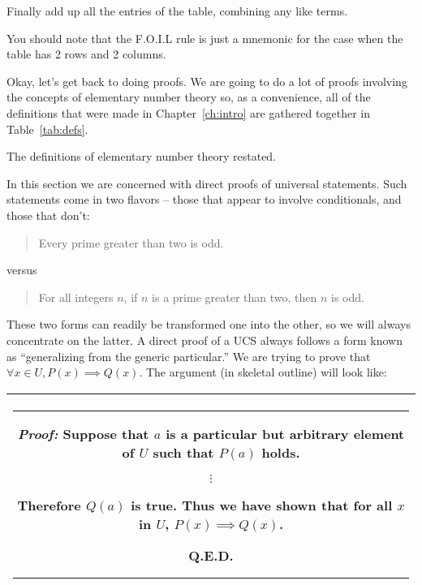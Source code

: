 Finally add up all the entries of the table, combining any like terms.

You should note that the F.O.I.L rule is just a mnemonic for the case when 
the table has 2 rows and 2 columns.

Okay, let's get back to doing proofs.  We are going to do a lot of
proofs involving the concepts of elementary number theory so, as a 
convenience, all of the definitions that were made in Chapter~\ref{ch:intro}
are gathered together in Table~\ref{tab:defs}.

\begin{table}[hbt] 

\caption{The definitions of elementary number theory restated.}
\label{tab:defs}
\end{table}

\clearpage 

In this section we are concerned with 
direct proofs of universal statements.  
Such statements come in two flavors -- those that appear to involve 
conditionals, and those that don't:

\begin{quote} Every prime greater than two is odd.
\end{quote}

versus

\begin{quote} For all integers $n$, if $n$ is a prime greater than two, then $n$ is odd.
\end{quote}

These two forms can readily be transformed one into the other, so 
we will always concentrate on the latter.  A direct proof of a UCS
always follows a form known as 
``generalizing from the generic particular.''
We are trying to prove that $\forall x \in U, P(x) \implies Q(x)$.  
The argument (in skeletal outline) will look like:
\medskip

\begin{center}
\begin{tabular}{|c|} \hline
\rule{16pt}{0pt}\begin{minipage}{.75\textwidth}
\rule{0pt}{20pt} {\em Proof:} Suppose that $a$ is a particular but arbitrary element of $U$ such 
that $P(a)$ holds.

\begin{center}
$\vdots$
\end{center}

Therefore $Q(a)$ is true. \newline
Thus we have shown that for all $x$ in $U$, $P(x) \implies Q(x)$.\newline
\rule{0pt}{0pt} \hspace{\fill} Q.E.D. \rule[-10pt]{0pt}{16pt}
\end{minipage} \rule{16pt}{0pt} \\ \hline
\end{tabular}
\end{center}
\medskip

